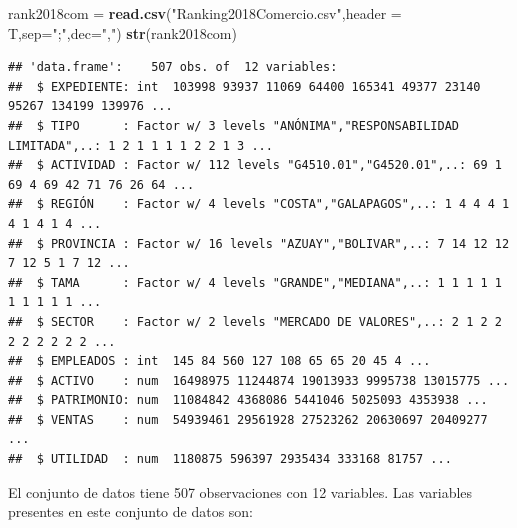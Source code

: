 \documentclass[letterpaper,]{book}
\newenvironment{Shaded}{\begin{snugshade}}{\end{snugshade}}
\newcommand{\DataTypeTok}[1]{\textcolor[rgb]{0.13,0.29,0.53}{#1}}
\newcommand{\KeywordTok}[1]{\textcolor[rgb]{0.13,0.29,0.53}{\textbf{#1}}}
\newcommand{\NormalTok}[1]{#1}
\newcommand{\StringTok}[1]{\textcolor[rgb]{0.31,0.60,0.02}{#1}}
\begin{document}
\begin{Shaded}
\begin{Highlighting}[]
\NormalTok{rank2018com =}\StringTok{ }\KeywordTok{read.csv}\NormalTok{(}\StringTok{"Ranking2018Comercio.csv"}\NormalTok{,}\DataTypeTok{header =}\NormalTok{ T,}\DataTypeTok{sep=}\StringTok{";"}\NormalTok{,}\DataTypeTok{dec=}\StringTok{","}\NormalTok{)}
\KeywordTok{str}\NormalTok{(rank2018com)}
\end{Highlighting}
\end{Shaded}

\begin{verbatim}
## 'data.frame':    507 obs. of  12 variables:
##  $ EXPEDIENTE: int  103998 93937 11069 64400 165341 49377 23140 95267 134199 139976 ...
##  $ TIPO      : Factor w/ 3 levels "ANÓNIMA","RESPONSABILIDAD LIMITADA",..: 1 2 1 1 1 1 2 2 1 3 ...
##  $ ACTIVIDAD : Factor w/ 112 levels "G4510.01","G4520.01",..: 69 1 69 4 69 42 71 76 26 64 ...
##  $ REGIÓN    : Factor w/ 4 levels "COSTA","GALAPAGOS",..: 1 4 4 4 1 4 1 4 1 4 ...
##  $ PROVINCIA : Factor w/ 16 levels "AZUAY","BOLIVAR",..: 7 14 12 12 7 12 5 1 7 12 ...
##  $ TAMA      : Factor w/ 4 levels "GRANDE","MEDIANA",..: 1 1 1 1 1 1 1 1 1 1 ...
##  $ SECTOR    : Factor w/ 2 levels "MERCADO DE VALORES",..: 2 1 2 2 2 2 2 2 2 2 ...
##  $ EMPLEADOS : int  145 84 560 127 108 65 65 20 45 4 ...
##  $ ACTIVO    : num  16498975 11244874 19013933 9995738 13015775 ...
##  $ PATRIMONIO: num  11084842 4368086 5441046 5025093 4353938 ...
##  $ VENTAS    : num  54939461 29561928 27523262 20630697 20409277 ...
##  $ UTILIDAD  : num  1180875 596397 2935434 333168 81757 ...
\end{verbatim}

El conjunto de datos tiene 507 observaciones con 12 variables. Las variables presentes en este conjunto de datos son:
\end{document}
